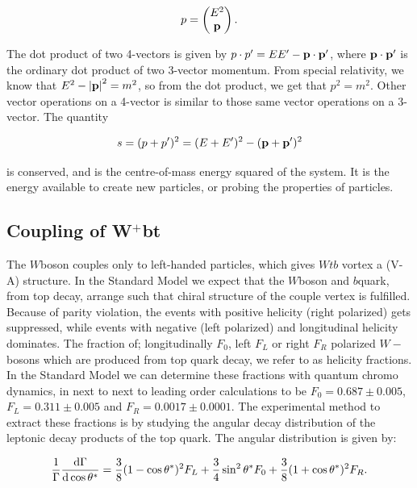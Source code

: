 \documentclass[11pt,a4paper]{article}
\begin{document}
\begin{equation}
p = \left(\begin{matrix} E^2 \\ \vb p \end{matrix} \right).
\end{equation}

The dot product of two 4-vectors is given by $p\cdot p' = E E' - \vb p \cdot \vb{p'}$, where $\vb p \cdot \vb{p'}$ is the ordinary dot product of two 3-vector momentum. From special relativity, we know that $E^2 - \abs{\vb p}^2 = m^2$, so from the dot product, we get that $p^2 = m^2$. Other vector operations on a 4-vector is similar to those same vector operations on a 3-vector. The quantity

\begin{equation}
s = (p + p')^2 = (E + E')^2 - (\vb p + \vb p')^2
\end{equation}

is conserved, and is the centre-of-mass energy squared of the system. It is the energy available to create new particles, or probing the properties of particles.

\subsection{Coupling of W$^+$bt}
The $W$boson couples only to left-handed particles, which gives $Wtb$ vortex a (V-A) structure. In the Standard Model we expect that the $W$boson and $b$quark, from top decay, arrange such that chiral structure of the couple vertex is fulfilled. Because of parity violation, the events with positive helicity (right polarized) gets suppressed, while events with negative (left polarized) and longitudinal helicity dominates. The fraction of; longitudinally $F_0$, left $F_L$ or right $F_R$ polarized $W-$bosons which are produced from top quark decay, we refer to as helicity fractions. In the Standard Model we can determine these fractions with quantum chromo dynamics, in next to next to leading order calculations to be $F_0 = 0.687 \pm 0.005$, $F_L = 0.311 \pm 0.005$ and $F_R = 0.0017 \pm 0.0001$. The experimental method to extract these fractions is by studying the angular decay distribution of the leptonic decay products of the top quark. The angular distribution is given by:

\begin{equation}
\frac{1}{\Gamma}\dv{\Gamma}{\cos \theta^*} = \frac{3}{8}(1-\cos \theta^*)^2 F_L + \frac{3}{4}\sin^2 \theta^* F_0 + \frac{3}{8}(1+\cos \theta^*)^2 F_R.
\end{equation}
\end{document}
